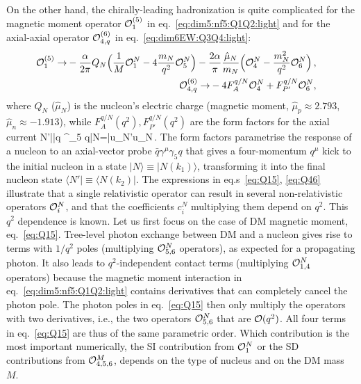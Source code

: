 \smallskip

On the other hand,
the chirally-leading hadronization  is quite complicated
for the magnetic moment operator ${\cal O}_{1}^{(5)}$ in eq.~\eqref{eq:dim5:nf5:Q1Q2:light} and 
for the axial-axial operator ${\cal O}_{4,q}^{(6)}$ in eq.~\eqref {eq:dim6EW:Q3Q4:light}:
\begin{align}
\begin{split}
\label{eq:Q15}
{\cal O}_{1}^{(5)}\to& -\frac{\alpha}{2\pi} Q_{N}\Big(
\frac{1}{M}{\mathcal O}_1^N-4 \frac{m_N}{ q^2}
{\mathcal O}_5^N\Big)-\frac{2\alpha}{\pi
}\frac{\hat \mu_N}{m_N}\Big({\mathcal O}_4^N-\frac{m_N^2}{ q^2}
{\mathcal O}_6^N\Big)\,, 
\end{split}
\\
\begin{split}
\label{eq:Q46}
{\cal O}_{4,q}^{(6)}\to& -4 F_A^{q/N} {\mathcal O}_4^N+F_{P'}^{q/N} {\mathcal O}_6^N,
\end{split}
\end{align}
where $Q_N$ ($\hat \mu_N$) is the nucleon's electric charge 
(magnetic moment, $\hat \mu_p\approx 2.793$, $\hat \mu_n\approx -1.913$),  
while $F_A^{q/N}(q^2), F_{P'}^{q/N}(q^2)$ are the form factors for the axial current
\beq
\label{axial:form:factor}
\langle N'|\bar q \gamma^\mu \gamma_5 q|N\rangle=\bar u_N'u_N\,.
\eeq
The form factors parametrise the response of a nucleon to an axial-vector probe $\bar q \gamma^\mu \gamma_5 q$ that gives  a four-momentum $q^\mu$ kick to the initial nucleon in a state $| N\rangle\equiv |
N(k_1)\rangle $, transforming it into the final nucleon state $\langle N'|\equiv\langle N(k_2)| $.  
The expressions in eq.s~\eqref{eq:Q15}, \eqref{eq:Q46} 
illustrate that a single relativistic operator can result in several non-relativistic operators ${\cal O}_i^N$, and that the coefficients $c_i^N$ multiplying them depend on $q^2$. 
This $q^2$ dependence is  known. 
Let us first focus on the case of DM magnetic moment, eq.~\eqref{eq:Q15}. 
Tree-level photon exchange between DM and a nucleon gives rise to terms with $1/{q}^2$ poles (multiplying ${\cal O}_{5,6}^N$ operators), as expected for a propagating photon. It also leads to ${q}^2$-independent contact terms (multiplying ${\cal O}_{1,4}^N$ operators) because the magnetic moment interaction in eq.~\eqref{eq:dim5:nf5:Q1Q2:light} contains derivatives that can completely cancel the photon pole. The photon poles in eq.~\eqref{eq:Q15} then only multiply the operators with two derivatives, i.e., the two operators ${\cal O}_{5,6}^N$ that are ${\cal O}(q^2)$. All four terms in eq.~\eqref{eq:Q15} are thus of the same parametric order. Which contribution is the most important numerically, the SI contribution from ${\cal O}_1^N$ or the SD contributions from ${\cal O}_{4,5,6}^M$, depends on the type of nucleus and on the DM mass $M$. 

